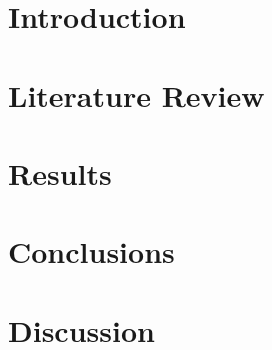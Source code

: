 \documentclass[fleqn]{cas-sc}
\begin{document}
\section{Introduction}\label{What does the label do?}








\section{Literature Review}











%		
%
%
%
%
%






%


%





\section{Results}


\section{Conclusions}

\section{Discussion}
\end{document}
